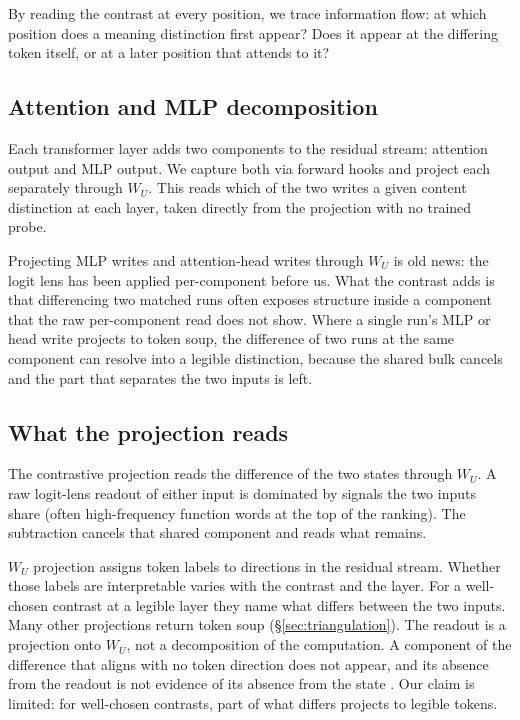 \documentclass[11pt]{article}
\newcommand{\WU}{W_U}
\begin{document}
By reading the contrast at every position, we trace information flow: at
which position does a meaning distinction first appear? Does it appear at
the differing token itself, or at a later position that attends to it?

\subsection{Attention and MLP decomposition}

Each transformer layer adds two components to the residual stream: attention
output and MLP output. We capture both via forward hooks and project each
separately through $\WU$. This reads which of the two writes a given content
distinction at each layer, taken directly from the projection with no
trained probe.

Projecting MLP writes and attention-head writes through $\WU$ is old news: the
logit lens has been applied per-component before us. What the contrast adds is
that differencing two matched runs often exposes structure inside a component
that the raw per-component read does not show. Where a single run's MLP or head
write projects to token soup, the difference of two runs at the same component
can resolve into a legible distinction, because the shared bulk cancels and the
part that separates the two inputs is left.

\subsection{What the projection reads}

The contrastive projection reads the difference of the two states through
$\WU$. A raw logit-lens readout of either input is dominated by signals
the two inputs share (often high-frequency function words at the top of
the ranking). The subtraction cancels that shared component and reads what
remains.

$\WU$ projection assigns token labels to directions in the residual stream.
Whether those labels are interpretable varies with the contrast and the layer.
For a well-chosen contrast at a legible layer they name what differs between the
two inputs. Many other projections return token soup (\S\ref{sec:triangulation}).
The readout is a projection onto $\WU$, not a decomposition of the computation.
A component of the difference that aligns with no token direction does not
appear, and its absence from the readout is not evidence of its absence from the
state \citep{tuomi2026visibility}. Our claim is limited: for well-chosen
contrasts, part of what differs projects to legible tokens.
\end{document}
